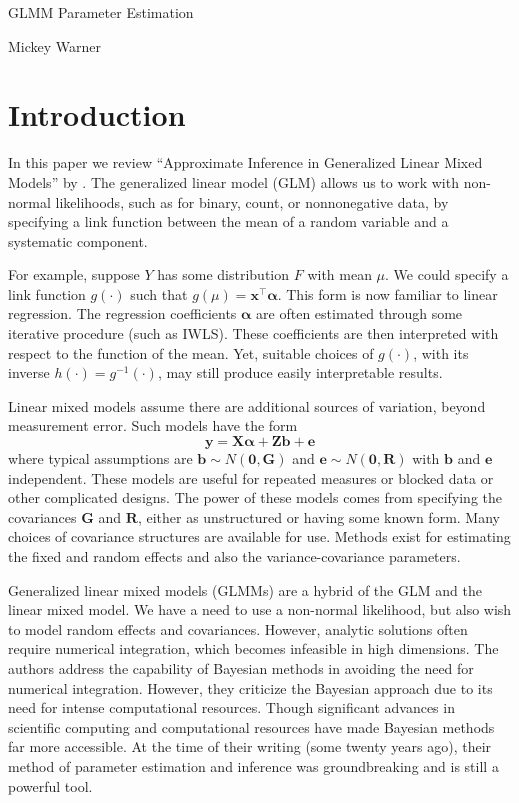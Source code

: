 \documentclass[12pt]{article}
\newcommand{\m}[1]{\mathbf{\bm{#1}}}
\begin{document}
\begin{Large}
\begin{center}
GLMM Parameter Estimation
\bigskip

Mickey Warner
\end{center}
\end{Large}

\section*{Introduction}

\noindent In this paper we review ``Approximate Inference in Generalized Linear Mixed Models'' by \cite{breslow:1993}. The generalized linear model (GLM) \citep{mccullagh:1989} allows us to work with non-normal likelihoods, such as for binary, count, or nonnonegative data, by specifying a link function between the mean of a random variable and a systematic component.

For example, suppose $Y$ has some distribution $F$ with mean $\mu$. We could specify a link function $g(\cdot)$ such that $g(\mu)=\m{x}^\top\m{\alpha}$. This form is now familiar to linear regression. The regression coefficients $\m{\alpha}$ are often estimated through some iterative procedure (such as IWLS). These coefficients are then interpreted with respect to the function of the mean. Yet, suitable choices of $g(\cdot)$, with its inverse $h(\cdot)=g^{-1}(\cdot)$, may still produce easily interpretable results.

Linear mixed models \citep{henderson:1959} assume there are additional sources of variation, beyond measurement error. Such models have the form
\[ \m{y} = \m{X}\m{\alpha} + \m{Z}\m{b} + \m{e} \]
where typical assumptions are $\m{b}\sim N(\m{0}, \m{G})$ and $\m{e}\sim N(\m{0}, \m{R})$ with $\m{b}$ and $\m{e}$ independent. These models are useful for repeated measures or blocked data or other complicated designs. The power of these models comes from specifying the covariances $\m{G}$ and $\m{R}$, either as unstructured or having some known form. Many choices of covariance structures are available for use. Methods exist for estimating the fixed and random effects and also the variance-covariance parameters.

Generalized linear mixed models (GLMMs) are a hybrid of the GLM and the linear mixed model. We have a need to use a non-normal likelihood, but also wish to model random effects and covariances. However, analytic solutions often require numerical integration, which becomes infeasible in high dimensions. The authors address the capability of Bayesian methods in avoiding the need for numerical integration. However, they criticize the Bayesian approach due to its need for intense computational resources. Though significant advances in scientific computing and computational resources have made Bayesian methods far more accessible. At the time of their writing (some twenty years ago), their method of parameter estimation and inference was groundbreaking and is still a powerful tool.
\end{document}
